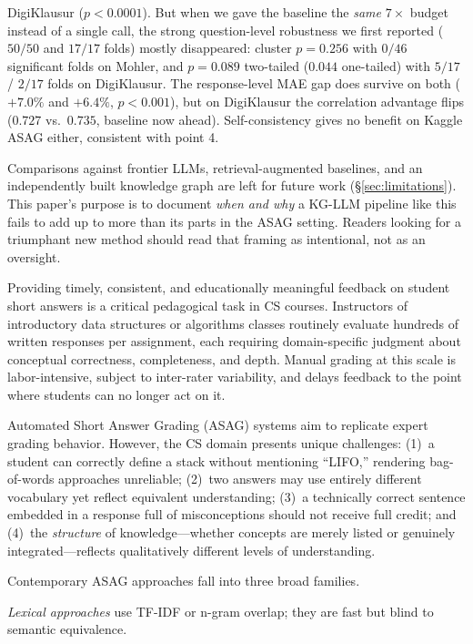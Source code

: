 \documentclass[conference]{IEEEtran}
\begin{document}
\begin{enumerate}
        DigiKlausur ($p<0.0001$). But when we gave the baseline the
        \emph{same} $7\times$ budget instead of a single call, the
        strong question-level robustness we first reported ($50/50$ and
        $17/17$ folds) mostly disappeared: cluster $p=0.256$ with $0/46$
        significant folds on Mohler, and $p=0.089$ two-tailed
        ($0.044$ one-tailed) with $5/17$ / $2/17$ folds on DigiKlausur.
        The response-level MAE gap does survive on both ($+7.0\%$ and
        $+6.4\%$, $p<0.001$), but on DigiKlausur the correlation
        advantage flips ($0.727$ vs.\ $0.735$, baseline now ahead).
        Self-consistency gives no benefit on Kaggle ASAG either,
        consistent with point 4.
\end{enumerate}

Comparisons against frontier LLMs, retrieval-augmented baselines, and an
independently built knowledge graph are left for future work
(\S\ref{sec:limitations}). This paper's purpose is to document
\emph{when and why} a KG-LLM pipeline like this fails to add up to more
than its parts in the ASAG setting. Readers looking for a triumphant new
method should read that framing as intentional, not as an oversight.


Providing timely, consistent, and educationally meaningful feedback on student
short answers is a critical pedagogical task in CS courses. Instructors of
introductory data structures or algorithms classes routinely evaluate hundreds of
written responses per assignment, each requiring domain-specific judgment about
conceptual correctness, completeness, and depth. Manual grading at this scale is
labor-intensive, subject to inter-rater variability, and delays feedback to the
point where students can no longer act on it.

Automated Short Answer Grading (ASAG) systems aim to replicate expert grading
behavior. However, the CS domain presents unique challenges: (1)~a student can
correctly define a stack without mentioning ``LIFO,'' rendering bag-of-words
approaches unreliable; (2)~two answers may use entirely different vocabulary yet
reflect equivalent understanding; (3)~a technically correct sentence embedded in a
response full of misconceptions should not receive full credit; and (4)~the
\emph{structure} of knowledge—whether concepts are merely listed or genuinely
integrated—reflects qualitatively different levels of understanding.

Contemporary ASAG approaches fall into three broad families. 

\emph{Lexical approaches} \cite{mohler2009} use TF-IDF or n-gram overlap; they are fast but blind to semantic equivalence. 
\end{document}
